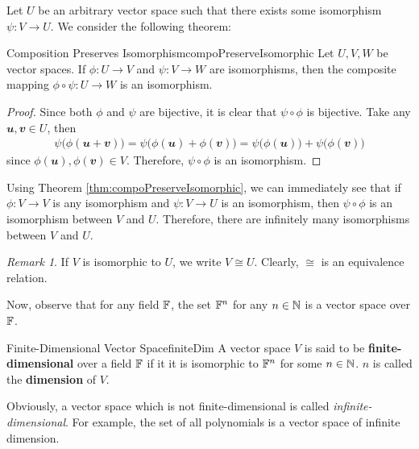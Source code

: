 \documentclass[math, code]{amznotes}
\theoremstyle{remark}
\newtheorem*{remark}{Remark}
\begin{document}
Let $U$ be an arbitrary vector space such that there exists some isomorphism $\psi \colon V \to U$. We consider the following theorem:
\begin{thmbox}{Composition Preserves Isomorphism}{compoPreserveIsomorphic}
    Let $U, V, W$ be vector spaces. If $\phi \colon U \to V$ and $\psi \colon V \to W$ are isomorphisms, then the composite mapping $\phi \circ \psi \colon U \to W$ is an isomorphism.
    \tcblower
    \begin{proof}
        Since both $\phi$ and $\psi$ are bijective, it is clear that $\psi \circ \phi$ is bijective. Take any $\mathbfit{u}, \mathbfit{v} \in U$, then
        \begin{align*}
            \psi\bigl(\phi(\mathbfit{u + v})\bigr) = \psi\bigl(\phi(\mathbfit{u}) + \phi(\mathbfit{v})\bigr) = \psi\bigl(\phi(\mathbfit{u})\bigr) + \psi\bigl(\phi(\mathbfit{v})\bigr)
        \end{align*}
        since $\phi(\mathbfit{u}), \phi(\mathbfit{v}) \in V$. Therefore, $\psi \circ \phi$ is an isomorphism.
    \end{proof}
\end{thmbox}
Using Theorem \ref{thm:compoPreserveIsomorphic}, we can immediately see that if $\phi \colon V \to V$ is any isomorphism and $\psi \colon V \to U$ is an isomorphism, then $\psi \circ \phi$ is an isomorphism between $V$ and $U$. Therefore, there are infinitely many isomorphisms between $V$ and $U$.
\begin{notebox}
    \begin{remark}
        If $V$ is isomorphic to $U$, we write $V \cong U$. Clearly, $\cong$ is an equivalence relation.
    \end{remark}
\end{notebox}

Now, observe that for any field $\mathbb{F}$, the set $\mathbb{F}^n$ for any $n \in \mathbb{N}$ is a vector space over $\mathbb{F}$.
\begin{dfnbox}{Finite-Dimensional Vector Space}{finiteDim}
    A vector space $V$ is said to be {\color{red} \textbf{finite-dimensional}} over a field $\mathbb{F}$ if it it is isomorphic to $\mathbb{F}^n$ for some $n \in \mathbb{N}$. $n$ is called the {\color{red} \textbf{dimension}} of $V$.
\end{dfnbox}
Obviously, a vector space which is not finite-dimensional is called \textit{infinite-dimensional}. For example, the set of all polynomials is a vector space of infinite dimension.
\end{document}
